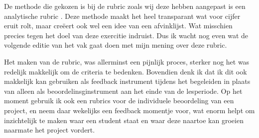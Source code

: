 De methode die gekozen is bij de rubric zoals wij deze hebben aangepast is een analytische rubric \cite[p.39]{syllabushan}. Deze methode maakt het heel transparant wat voor cijfer eruit rolt, maar creëert ook wel een idee van een afvinklijst. Wat misschien precies tegen het doel van deze exercitie indruist. Dus ik wacht nog even wat de volgende editie van het vak gaat doen met mijn mening over deze rubric.

Het maken van de rubric, was allerminst een pijnlijk proces, sterker nog het was redelijk makkelijk om de criteria te bedenken. Bovendien denk ik dat ik dit ook makkelijk kan gebruiken als feedback instrument tijdens het begeleiden in plaats van alleen als beoordelinsginstrument aan het einde van de lesperiode. Op het moment gebruik ik ook een rubrics voor de individuele beoordeling van een project, en neem daar wekelijks een feedback momentje voor, wat enorm helpt om inzichtelijk te maken waar een student staat en waar deze naartoe kan groeien naarmate het project vordert.